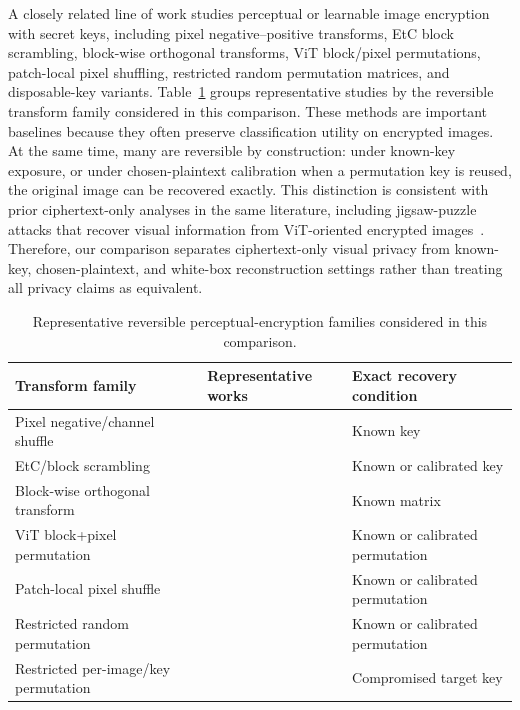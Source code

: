 \documentclass{ieeeaccess}
\newcommand{\rev}[1]{{\color{green}#1}}
\begin{document}
\rev{A closely related line of work studies perceptual or learnable image encryption with secret keys, including pixel negative--positive transforms, EtC block scrambling, block-wise orthogonal transforms, ViT block/pixel permutations, patch-local pixel shuffling, restricted random permutation matrices, and disposable-key variants. Table~\ref{tab:reversible-family-map} groups representative studies by the reversible transform family considered in this comparison. These methods are important baselines because they often preserve classification utility on encrypted images. At the same time, many are reversible by construction: under known-key exposure, or under chosen-plaintext calibration when a permutation key is reused, the original image can be recovered exactly. This distinction is consistent with prior ciphertext-only analyses in the same literature, including jigsaw-puzzle attacks that recover visual information from ViT-oriented encrypted images~\cite{chuman2023_jigsaw}. Therefore, our comparison separates ciphertext-only visual privacy from known-key, chosen-plaintext, and white-box reconstruction settings rather than treating all privacy claims as equivalent.}

\begin{table}[t]
\centering
\caption{\rev{Representative reversible perceptual-encryption families considered in this comparison.}}
\label{tab:reversible-family-map}
\small
\setlength{\tabcolsep}{4pt}
\begin{tabular}{@{}p{} p{} p{}@{}}
\toprule
\rev{\textbf{Transform family}} & \rev{\textbf{Representative works}} & \rev{\textbf{Exact recovery condition}} \\
\midrule
\rev{Pixel negative/channel shuffle} & \rev{\cite{sirichotedumrong2019pixel}} & \rev{Known key} \\
\rev{EtC/block scrambling} & \rev{\cite{kawamura2020etc,maungmaung2022isotropic,qi2022convmixer_adaptive_permutation,hamano2023jpeg_etc_vit,lin2024convmixer}} & \rev{Known or calibrated key} \\
\rev{Block-wise orthogonal transform} & \rev{\cite{aso2023random_orthogonal_convmixer}} & \rev{Known matrix} \\
\rev{ViT block+pixel permutation} & \rev{\cite{qi2022vit,nagamori2023federated_vit,nagamori2024domain_adaptation,kiya2023reliable_vit}} & \rev{Known or calibrated permutation} \\
\rev{Patch-local pixel shuffle} & \rev{\cite{iijima2022convmixer_model_encryption,kiya2023image_model,jimaging8090233}} & \rev{Known or calibrated permutation} \\
\rev{Restricted random permutation} & \rev{\cite{horio2024privacypreservingvisiontransformerusing}} & \rev{Known or calibrated permutation} \\
\rev{Restricted per-image/key permutation} & \rev{\cite{aso2024disposable,hirose2025no_key_management}} & \rev{Compromised target key} \\
\bottomrule
\end{tabular}
\end{table}
\end{document}
